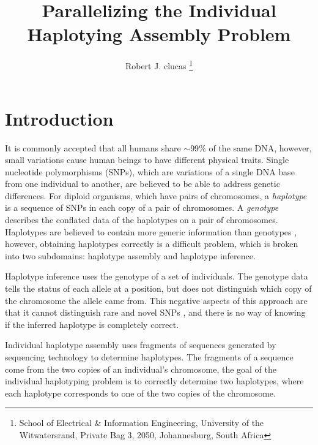 \documentclass[10pt,twocolumn]{witseiepaper}
\begin{document}
\title{ Parallelizing the Individual Haplotying Assembly Problem }

\author{Robert J. clucas
\thanks{School of Electrical \& Information Engineering, University of the
Witwatersrand, Private Bag 3, 2050, Johannesburg, South Africa}
}


\abstract{}


\maketitle
\thispagestyle{empty}\pagestyle{empty}



\section{Introduction}

It is commonly accepted that all humans share $\mathtt{\sim}$99$\%$ of the same DNA, however, small variations 
cause human beings to have different physical traits. Single nucleotide polymorphisms (SNPs), which are
variations of a single DNA base from one individual to another, are believed to be able to address
genetic differences. For diploid organisms, which have pairs of chromosomes, a \textit{haplotype} is a 
sequence of SNPs in each copy of a pair of chromosomes. A \textit{genotype} describes the conflated data of the
haplotypes on a pair of chromosomes. Haplotypes are believed to contain more generic information than
genotypes \cite{stephens:2001}, however, obtaining haplotypes correctly is a difficult problem, which is 
broken into two subdomains: haplotype assembly and haplotype inference. 

Haplotype inference uses the genotype of a set of individuals. The genotype data tells the status of each
allele at a position, but does not distinguish which copy of the chromosome the allele came from.
This negative aspects of this approach are that it cannot distinguish rare and novel SNPs \cite{he:2010}, 
and there is no way of knowing if the inferred haplotype is completely correct. 

Individual haplotype assembly uses fragments of sequences generated by sequencing technology to determine
haplotypes. The fragments of a sequence come from the two copies of an individual's chromosome, the goal of the
individual haplotyping problem is to correctly determine two haplotypes, where each haplotype corresponds to
one of the two copies of the chromosome. 
\end{document}
